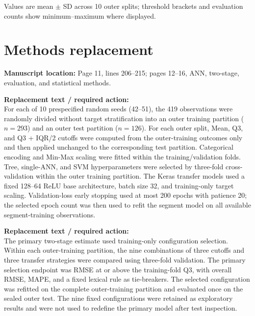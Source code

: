 \documentclass[10pt]{article}
\newcommand{\loc}[1]{\textbf{Manuscript location:} #1}
\newcommand{\replacewith}[1]{\textbf{Replacement text / required action:}\\{\color{revisionblue}#1}}
\begin{document}
\begin{center}
\scriptsize
{}
\end{center}

Values are mean $\pm$ SD across 10 outer splits; threshold brackets and evaluation counts show minimum--maximum where displayed.

\section{Methods replacement}

\loc{Page 11, lines 206--215; pages 12--16, ANN, two-stage, evaluation, and statistical methods.}

\replacewith{For each of 10 prespecified random seeds (42--51), the 419 observations were randomly divided without target stratification into an outer training partition ($n=293$) and an outer test partition ($n=126$). For each outer split, Mean, Q3, and Q3 + IQR/2 cutoffs were computed from the outer-training outcomes only and then applied unchanged to the corresponding test partition. Categorical encoding and Min-Max scaling were fitted within the training/validation folds. Tree, single-ANN, and SVM hyperparameters were selected by three-fold cross-validation within the outer training partition. The Keras transfer models used a fixed 128--64 ReLU base architecture, batch size 32, and training-only target scaling. Validation-loss early stopping used at most 200 epochs with patience 20; the selected epoch count was then used to refit the segment model on all available segment-training observations.}

\replacewith{The primary two-stage estimate used training-only configuration selection. Within each outer-training partition, the nine combinations of three cutoffs and three transfer strategies were compared using three-fold validation. The primary selection endpoint was RMSE at or above the training-fold Q3, with overall RMSE, MAPE, and a fixed lexical rule as tie-breakers. The selected configuration was refitted on the complete outer-training partition and evaluated once on the sealed outer test. The nine fixed configurations were retained as exploratory results and were not used to redefine the primary model after test inspection.}
\end{document}
